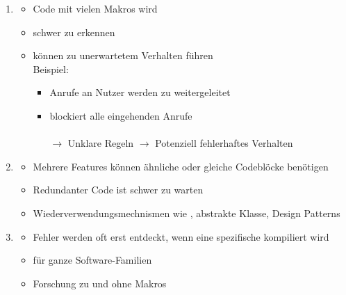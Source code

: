 \begin{infoBox}[title=Herausforderungen in SPLE]
    \begin{enumerate}
        \item {}
        \begin{itemize}
            \item Code mit vielen Makros wird 
            \item {} schwer zu erkennen
            \item {} können zu unerwartetem Verhalten führen\\
            Beispiel:
            \begin{itemize}
                \item {} Anrufe an Nutzer  werden zu  weitergeleitet
                \item {}  blockiert alle eingehenden Anrufe\\
                \\
                $\rightarrow$ Unklare Regeln $\rightarrow$ Potenziell fehlerhaftes Verhalten
            \end{itemize}
        \end{itemize}
        \item {}
        \begin{itemize}
            \item Mehrere Features können ähnliche oder gleiche Codeblöcke benötigen
            \item Redundanter Code ist schwer zu warten
            \item {} Wiederverwendungsmechnismen wie , abstrakte Klasse, Design Patterns
        \end{itemize}
        \item {}
        \begin{itemize}
            \item Fehler werden oft erst entdeckt, wenn eine spezifische  kompiliert wird
            \item {} für ganze Software-Familien
            \item {} Forschung zu  und  ohne Makros
        \end{itemize}
    \end{enumerate}
\end{infoBox}
